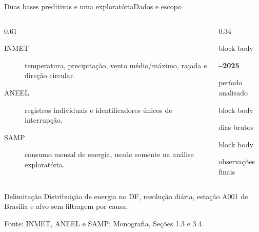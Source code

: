 \documentclass[10pt]{beamer}
\newcommand{\source}[1]{%
  \par\vfill{\raggedleft\tiny\color{gray}Fonte: #1\par}%
}
\begin{document}
\begin{frame}{Duas bases preditivas e uma exploratória}{Dados e escopo}
  \begin{columns}[T,onlytextwidth]
    \begin{column}{0.61\textwidth}
      \begin{description}
        \item[INMET] temperatura, precipitação, vento médio/máximo, rajada e direção circular.
        \item[ANEEL] registros individuais e identificadores únicos de interrupção.
        \item[SAMP] consumo mensal de energia, usado somente na análise exploratória.
      \end{description}
    \end{column}
    \begin{column}{0.34\textwidth}
      \begin{beamercolorbox}[rounded=true,sep=0.30em,wd=\linewidth]{block body}
        \centering
        {\color{UnBBlue}\bfseries\fontsize{17}{19}--2025\par}
        {\scriptsize período analisado}
      \end{beamercolorbox}
      \vspace{0.22em}
      \begin{beamercolorbox}[rounded=true,sep=0.30em,wd=\linewidth]{block body}
        \centering
        {\color{UnBBlue}\bfseries\fontsize{20}{22}\par}
        {\scriptsize dias brutos}
      \end{beamercolorbox}
      \vspace{0.22em}
      \begin{beamercolorbox}[rounded=true,sep=0.30em,wd=\linewidth]{block body}
        \centering
        {\color{UnBBlue}\bfseries\fontsize{20}{22}\par}
        {\scriptsize observações finais}
      \end{beamercolorbox}
    \end{column}
  \end{columns}

  \vspace{0.5em}
  \begin{block}{Delimitação}
    Distribuição de energia no DF, resolução diária, estação A001 de Brasília e alvo sem filtragem por causa.
  \end{block}

  \source{INMET, ANEEL e SAMP; Monografia, Seções 1.3 e 3.4.}
\end{frame}
\end{document}
